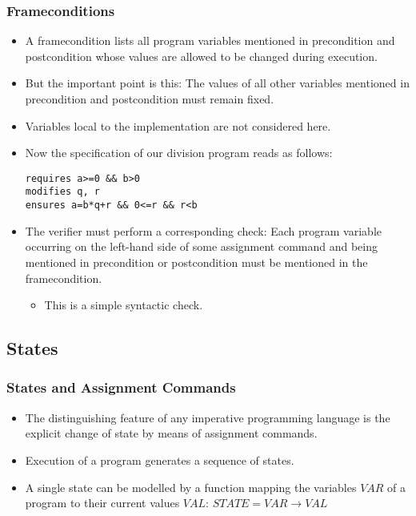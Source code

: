 \begin{multicols}{2}
\subsubsection{Frameconditions}
\begin{itemize}
  \item A framecondition lists all program variables mentioned in precondition and postcondition whose values are allowed to be changed during execution.
  \item But the important point is this: The values of all other variables mentioned in precondition and postcondition must remain fixed.
  \item Variables local to the implementation are not considered here.
  \item Now the specification of our division program reads as follows:
\begin{lstlisting}
requires a>=0 && b>0
modifies q, r
ensures a=b*q+r && 0<=r && r<b
\end{lstlisting}
  \item The verifier must perform a corresponding check: Each program variable occurring on the left-hand side of some assignment command and being mentioned in precondition or postcondition must be mentioned in the framecondition.
  \begin{itemize}
    \item This is a simple syntactic check.
  \end{itemize}
\end{itemize}

\subsection{States}
\subsubsection{States and Assignment Commands}
\begin{itemize}
  \item The distinguishing feature of any imperative programming language is the explicit change of state by means of assignment commands.
  \item Execution of a program generates a sequence of states.
  \item A single state can be modelled by a function mapping the variables $VAR$ of a program to their current values $VAL$:
  $STATE = VAR \rightarrow VAL$
\end{itemize}


\end{multicols}
